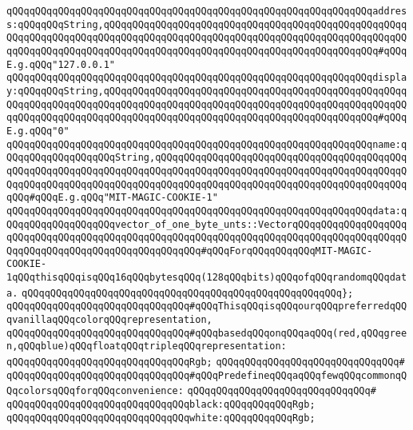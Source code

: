 \verb|qQQqqQQqqQQqqQQqqQQqqQQqqQQqqQQqqQQqqQQqqQQqqQQqqQQqqQQqqQQqqQQqaddress:qQQqqQQqString,qQQqqQQqqQQqqQQqqQQqqQQqqQQqqQQqqQQqqQQqqQQqqQQqqQQqqQQqqQQqqQQqqQQqqQQqqQQqqQQqqQQqqQQqqQQqqQQqqQQqqQQqqQQqqQQqqQQqqQQqqQQqqQQqqQQqqQQqqQQqqQQqqQQqqQQqqQQqqQQqqQQqqQQqqQQqqQQqqQQqqQQqqQQq#qQQqE.g.qQQq"127.0.0.1"|\newline
\verb|qQQqqQQqqQQqqQQqqQQqqQQqqQQqqQQqqQQqqQQqqQQqqQQqqQQqqQQqqQQqqQQqdisplay:qQQqqQQqString,qQQqqQQqqQQqqQQqqQQqqQQqqQQqqQQqqQQqqQQqqQQqqQQqqQQqqQQqqQQqqQQqqQQqqQQqqQQqqQQqqQQqqQQqqQQqqQQqqQQqqQQqqQQqqQQqqQQqqQQqqQQqqQQqqQQqqQQqqQQqqQQqqQQqqQQqqQQqqQQqqQQqqQQqqQQqqQQqqQQqqQQqqQQq#qQQqE.g.qQQq"0"|\newline
\verb|qQQqqQQqqQQqqQQqqQQqqQQqqQQqqQQqqQQqqQQqqQQqqQQqqQQqqQQqqQQqqQQqname:qQQqqQQqqQQqqQQqqQQqString,qQQqqQQqqQQqqQQqqQQqqQQqqQQqqQQqqQQqqQQqqQQqqQQqqQQqqQQqqQQqqQQqqQQqqQQqqQQqqQQqqQQqqQQqqQQqqQQqqQQqqQQqqQQqqQQqqQQqqQQqqQQqqQQqqQQqqQQqqQQqqQQqqQQqqQQqqQQqqQQqqQQqqQQqqQQqqQQqqQQqqQQqqQQq#qQQqE.g.qQQq"MIT-MAGIC-COOKIE-1"|\newline
\verb|qQQqqQQqqQQqqQQqqQQqqQQqqQQqqQQqqQQqqQQqqQQqqQQqqQQqqQQqqQQqqQQqdata:qQQqqQQqqQQqqQQqqQQqvector_of_one_byte_unts::VectorqQQqqQQqqQQqqQQqqQQqqQQqqQQqqQQqqQQqqQQqqQQqqQQqqQQqqQQqqQQqqQQqqQQqqQQqqQQqqQQqqQQqqQQqqQQqqQQqqQQqqQQqqQQqqQQqqQQqqQQqqQQq#qQQqForqQQqqQQqqQQqMIT-MAGIC-COOKIE-1qQQqthisqQQqisqQQq16qQQqbytesqQQq(128qQQqbits)qQQqofqQQqrandomqQQqdata.|\newline
\verb|qQQqqQQqqQQqqQQqqQQqqQQqqQQqqQQqqQQqqQQqqQQqqQQqqQQqqQQq};|\newline
\newline
\verb|qQQqqQQqqQQqqQQqqQQqqQQqqQQqqQQq#qQQqThisqQQqisqQQqourqQQqpreferredqQQqvanillaqQQqcolorqQQqrepresentation,|\newline
\verb|qQQqqQQqqQQqqQQqqQQqqQQqqQQqqQQq#qQQqbasedqQQqonqQQqaqQQq(red,qQQqgreen,qQQqblue)qQQqfloatqQQqtripleqQQqrepresentation:|\newline
\verb|qQQqqQQqqQQqqQQqqQQqqQQqqQQqqQQqRgb;|\newline
\verb|qQQqqQQqqQQqqQQqqQQqqQQqqQQqqQQq#|\newline
\verb|qQQqqQQqqQQqqQQqqQQqqQQqqQQqqQQq#qQQqPredefineqQQqaqQQqfewqQQqcommonqQQqcolorsqQQqforqQQqconvenience:|\newline
\verb|qQQqqQQqqQQqqQQqqQQqqQQqqQQqqQQq#|\newline
\verb|qQQqqQQqqQQqqQQqqQQqqQQqqQQqqQQqblack:qQQqqQQqqQQqRgb;|\newline
\verb|qQQqqQQqqQQqqQQqqQQqqQQqqQQqqQQqwhite:qQQqqQQqqQQqRgb;|\newline
